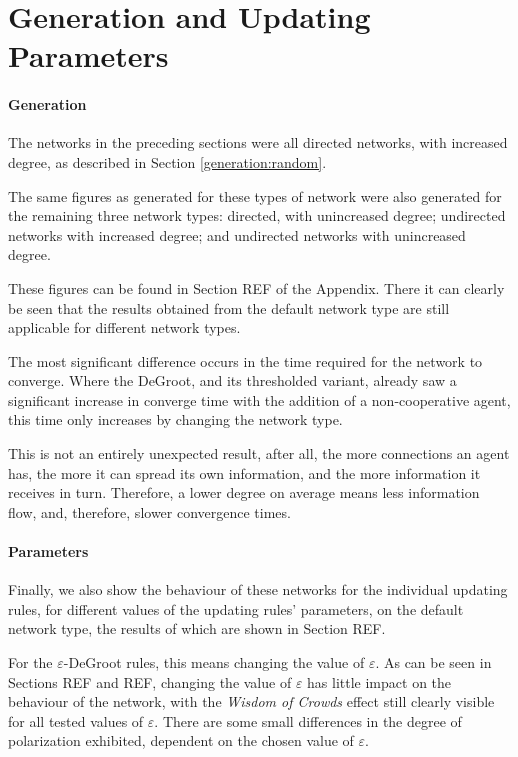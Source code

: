 \documentclass[a4paper, 12pt]{report}
\begin{document}
\newpage

\section{Generation and Updating Parameters}
\label{results:additional}
\paragraph{Generation} The networks in the preceding sections were all directed networks, with increased degree, as described in Section \ref{generation:random}.

The same figures as generated for these types of network were also generated for the remaining three network types: directed, with unincreased degree; undirected networks with increased degree; and undirected networks with unincreased degree.

These figures can be found in Section REF of the Appendix. There it can clearly be seen that the results obtained from the default network type are still applicable for different network types.

The most significant difference occurs in the time required for the network to converge. Where the DeGroot, and its thresholded variant, already saw a significant increase in converge time with the addition of a non-cooperative agent, this time only increases by changing the network type. 

This is not an entirely unexpected result, after all, the more connections an agent has, the more it can spread its own information, and the more information it receives in turn. Therefore, a lower degree on average means less information flow, and, therefore, slower convergence times.
\paragraph{Parameters} Finally, we also show the behaviour of these networks for the individual updating rules, for different values of the updating rules' parameters, on the default network type, the results of which are shown in Section REF.

For the $\varepsilon$-DeGroot rules, this means changing the value of $\varepsilon$. As can be seen in Sections REF and REF, changing the value of $\varepsilon$ has little impact on the behaviour of the network, with the \emph{Wisdom of Crowds} effect still clearly visible for all tested values of $\varepsilon$. There are some small differences in the degree of polarization exhibited, dependent on the chosen value of $\varepsilon$.
\end{document}
